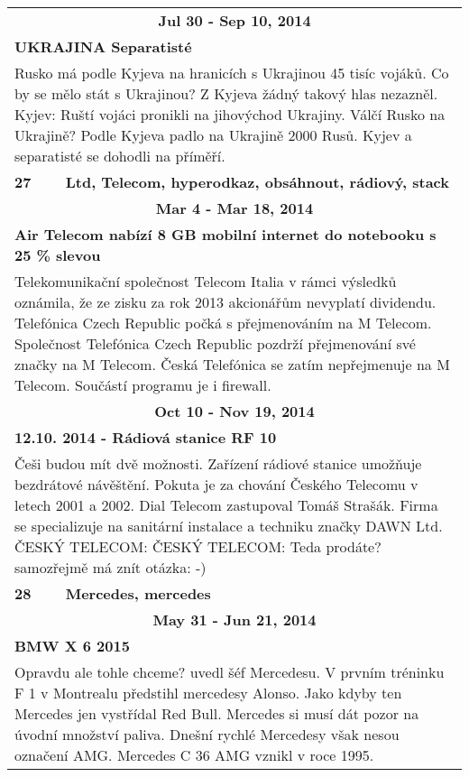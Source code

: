 \begin{tabularx}{\linewidth}{l l}
                \multicolumn{2}{c}{\bf Jul 30 - Sep 10, 2014} \\
                \multicolumn{2}{p{\linewidth}}{\bf UKRAJINA Separatisté} \\
                \multicolumn{2}{p{\linewidth}}{Rusko má podle Kyjeva na hranicích s Ukrajinou 45 tisíc vojáků. Co by se mělo stát s Ukrajinou? Z Kyjeva žádný takový hlas nezazněl. Kyjev: Ruští vojáci pronikli na jihovýchod Ukrajiny.  Válčí Rusko na Ukrajině? Podle Kyjeva padlo na Ukrajině 2000 Rusů. Kyjev a separatisté se dohodli na příměří.} \\ \midrule
                [1.5pt]

            \bf 27 & \bf Ltd, Telecom, hyperodkaz, obsáhnout, rádiový, stack \\ \midrule
            
                \multicolumn{2}{c}{\bf Mar 4 - Mar 18, 2014} \\
                \multicolumn{2}{p{\linewidth}}{\bf Air Telecom nabízí 8 GB mobilní internet do notebooku s 25 \% slevou} \\
                \multicolumn{2}{p{\linewidth}}{Telekomunikační společnost Telecom Italia v rámci výsledků oznámila, že ze zisku za rok 2013 akcionářům nevyplatí dividendu. Telefónica Czech Republic počká s přejmenováním na M Telecom. Společnost Telefónica Czech Republic pozdrží přejmenování své značky na M Telecom. Česká Telefónica se zatím nepřejmenuje na M Telecom. Součástí programu je i firewall.} \\ \midrule
                
                \multicolumn{2}{c}{\bf Oct 10 - Nov 19, 2014} \\
                \multicolumn{2}{p{\linewidth}}{\bf 12.10. 2014 - Rádiová stanice RF 10} \\
                \multicolumn{2}{p{\linewidth}}{Češi budou mít dvě možnosti. Zařízení rádiové stanice umožňuje bezdrátové návěštění. Pokuta je za chování Českého Telecomu v letech 2001 a 2002. Dial Telecom zastupoval Tomáš Strašák. Firma se specializuje na sanitární instalace a techniku značky DAWN Ltd. ČESKÝ TELECOM: ČESKÝ TELECOM: Teda prodáte? samozřejmě má znít otázka: -)} \\ \midrule
                [1.5pt]

            \bf 28 & \bf Mercedes, mercedes \\ \midrule
            
                \multicolumn{2}{c}{\bf May 31 - Jun 21, 2014} \\
                \multicolumn{2}{p{\linewidth}}{\bf BMW X 6 2015} \\
                \multicolumn{2}{p{\linewidth}}{Opravdu ale tohle chceme?  uvedl šéf Mercedesu. V prvním tréninku F 1 v Montrealu předstihl mercedesy Alonso. Jako kdyby ten Mercedes jen vystřídal Red Bull. Mercedes si musí dát pozor na úvodní množství paliva. Dnešní rychlé Mercedesy však nesou označení AMG. Mercedes C 36 AMG vznikl v roce 1995.} \\ \midrule
                [1.5pt]


\end{tabularx}
